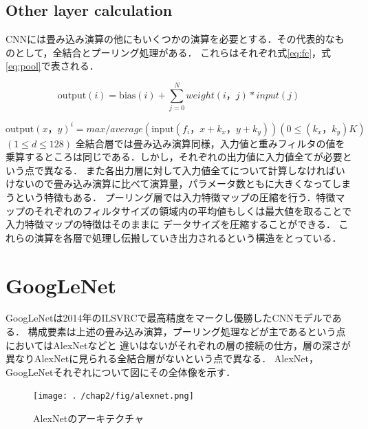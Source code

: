 {\subsection{Other layer calculation}
\label{sec:other_calc}
CNNには畳み込み演算の他にもいくつかの演算を必要とする．その代表的なものとして，全結合とプーリング処理がある．
これらはそれぞれ式\ref{eq:fc}，式\ref{eq:pool}で表される．

\begin{equation}
  \label{eq:fc}
  \mathrm{output}(i) = \mathrm{bias}(i) + \sum_{j=0}^{N} weight(i， j) * input(j)
\end{equation}

\begin{equation}
  \label{eq:pool}
	\mathrm{output}(x， y)^{i} = max / average(\mathrm{input}(f_i，x + k_x， y + k_y)) (0 \leq (k_x， k_y)  K)
\end{equation}
$(1 \leq d \leq 128)$
全結合層では畳み込み演算同様，入力値と重みフィルタの値を乗算するところは同じである．しかし，それぞれの出力値に入力値全てが必要という点で異なる．
また各出力層に対して入力値全てについて計算しなければいけないので畳み込み演算に比べて演算量，パラメータ数ともに大きくなってしまうという特徴もある．
プーリング層では入力特徴マップの圧縮を行う．特徴マップのそれぞれのフィルタサイズの領域内の平均値もしくは最大値を取ることで入力特徴マップの特徴はそのままに
データサイズを圧縮することができる．
これらの演算を各層で処理し伝搬していき出力されるという構造をとっている．

\section{GoogLeNet}
\label{sec:googlenet}
GoogLeNetは2014年のILSVRCで最高精度をマークし優勝したCNNモデルである．
構成要素は上述の畳み込み演算，プーリング処理などが主であるという点においてはAlexNetなどと
違いはないがそれぞれの層の接続の仕方，層の深さが異なりAlexNetに見られる全結合層がないという点で異なる．
AlexNet， GoogLeNetそれぞれについて図にその全体像を示す．


\begin{figure}[h]
  \centering
  \texttt{[image: ．/chap2/fig/alexnet.png]}
  \caption{AlexNetのアーキテクチャ}
  \label{fig:alexnet}
\end{figure}

}
